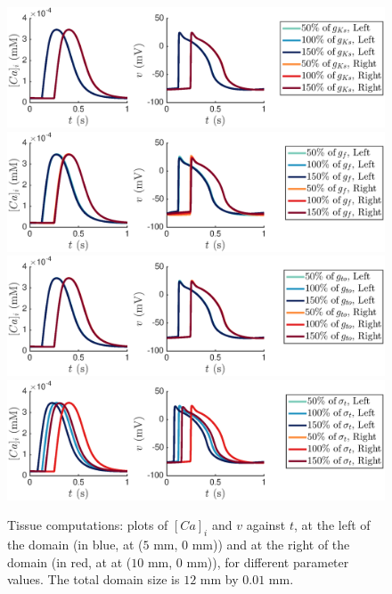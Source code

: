 \documentclass{article}
\begin{document}
%
\begin{figure}
   \includegraphics[trim=3cm 0cm 4cm 0cm, clip=true, width=1\linewidth]{strip_gks} 
   \includegraphics[trim=3cm 0cm 4cm 0cm, clip=true, width=1\linewidth]{strip_gf} 
      \includegraphics[trim=3cm 0cm 4cm 0cm, clip=true, width=1\linewidth]{strip_gto} 
         \includegraphics[trim=3cm 0cm 4cm 0cm, clip=true, width=1\linewidth]{strip_sigmat} 
    \caption{Tissue computations: plots of $[Ca]_i$ and $v$ against $t$, at the left of the domain (in blue, at ($5$ mm, $0$ mm)) and at the right of the domain (in red, at at ($10$ mm, $0$ mm)), for different parameter values. The total domain size is $12$ mm by $0.01$ mm.}
    \label{fig:5}
\end{figure}
%
\end{document}
